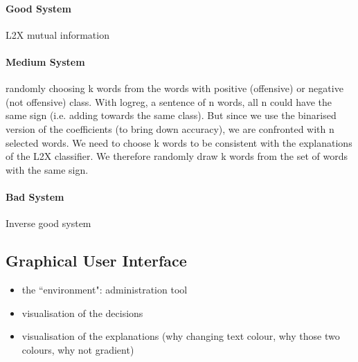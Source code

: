 \paragraph{Good System}
L2X mutual information

\paragraph{Medium System}
randomly choosing k words from the words with positive (offensive) or negative (not offensive) class. With logreg, a sentence of n words, all n could have the same sign (i.e. adding towards the same class). But since we use the binarised version of the coefficients (to bring down accuracy), we are confronted with n selected words. We need to choose k words to be consistent with the explanations of the L2X classifier. We therefore randomly draw k words from the set of words with the same sign.

\paragraph{Bad System}
Inverse good system



\subsection{Graphical User Interface}
\begin{itemize}
	\item the ``environment": administration tool
	\item visualisation of the decisions
	\item visualisation of the explanations (why changing text colour, why those two colours, why not gradient)
\end{itemize}

